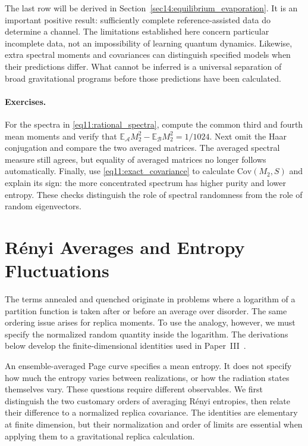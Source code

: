 \documentclass[11pt,letterpaper]{article}
\theoremstyle{plain}
\theoremstyle{definition}
\theoremstyle{remark}
\newcommand{\E}{\mathbb{E}}
\newcommand{\Cov}{\text{Cov}}
\begin{document}
The last row will be derived in
Section~\ref{sec14:equilibrium_evaporation}. It is an important positive
result: sufficiently complete reference-assisted data do determine a
channel. The limitations established here concern particular incomplete
data, not an impossibility of learning quantum dynamics. Likewise,
extra spectral moments and covariances can distinguish specified models
when their predictions differ. What cannot be inferred is a universal
separation of broad gravitational programs before those predictions
have been calculated.

\paragraph{Exercises.}
For the spectra in \eqref{eq11:rational_spectra}, compute the common
third and fourth mean moments and verify that
$\E_{\mathcal A}M_2^2-\E_{\mathcal B}M_2^2=1/1024$.
Next omit the Haar conjugation and compare the two averaged matrices.
The averaged spectral measure still agrees, but equality of averaged
matrices no longer follows automatically. Finally, use
\eqref{eq11:exact_covariance} to calculate $\Cov(M_2,S)$ and explain
its sign: the more concentrated spectrum has higher purity and lower
entropy. These checks distinguish the role of spectral randomness
from the role of random eigenvectors.

\section{R\'enyi Averages and Entropy Fluctuations}
\label{sec12:annealed_quenched}

The terms annealed and quenched originate in problems where a logarithm
of a partition function is taken after or before an average over
disorder. The same ordering issue arises for replica moments. To use
the analogy, however, we must specify the normalized random quantity
inside the logarithm. The derivations below develop the finite-dimensional
identities used in Paper~III~\citep{wuebben2026paper3}.

An ensemble-averaged Page curve specifies a mean entropy.  It does not
specify how much the entropy varies between realizations, or how the
radiation states themselves vary.  These questions require different
observables.  We first distinguish the two customary orders of averaging
R\'enyi entropies, then relate their difference to a normalized replica
covariance.  The identities are elementary at finite dimension, but their
normalization and order of limits are essential when applying them to a
gravitational replica calculation.
\end{document}
